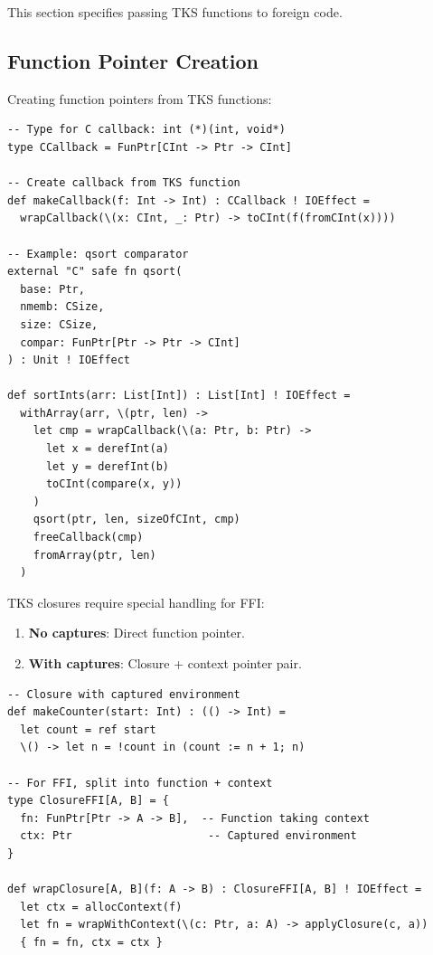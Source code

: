This section specifies passing TKS functions to foreign code.

\subsection{Function Pointer Creation}
\label{subsec:funptr-creation}

\begin{definition}
\label{def:callback-syntax}
Creating function pointers from TKS functions:
\begin{verbatim}
-- Type for C callback: int (*)(int, void*)
type CCallback = FunPtr[CInt -> Ptr -> CInt]

-- Create callback from TKS function
def makeCallback(f: Int -> Int) : CCallback ! IOEffect =
  wrapCallback(\(x: CInt, _: Ptr) -> toCInt(f(fromCInt(x))))

-- Example: qsort comparator
external "C" safe fn qsort(
  base: Ptr,
  nmemb: CSize,
  size: CSize,
  compar: FunPtr[Ptr -> Ptr -> CInt]
) : Unit ! IOEffect

def sortInts(arr: List[Int]) : List[Int] ! IOEffect =
  withArray(arr, \(ptr, len) ->
    let cmp = wrapCallback(\(a: Ptr, b: Ptr) ->
      let x = derefInt(a)
      let y = derefInt(b)
      toCInt(compare(x, y))
    )
    qsort(ptr, len, sizeOfCInt, cmp)
    freeCallback(cmp)
    fromArray(ptr, len)
  )
\end{verbatim}
\end{definition}

\begin{definition}
\label{def:closure-conversion}
TKS closures require special handling for FFI:
\begin{enumerate}
  \item \textbf{No captures}: Direct function pointer.
  \item \textbf{With captures}: Closure + context pointer pair.
\end{enumerate}
\begin{verbatim}
-- Closure with captured environment
def makeCounter(start: Int) : (() -> Int) =
  let count = ref start
  \() -> let n = !count in (count := n + 1; n)

-- For FFI, split into function + context
type ClosureFFI[A, B] = {
  fn: FunPtr[Ptr -> A -> B],  -- Function taking context
  ctx: Ptr                     -- Captured environment
}

def wrapClosure[A, B](f: A -> B) : ClosureFFI[A, B] ! IOEffect =
  let ctx = allocContext(f)
  let fn = wrapWithContext(\(c: Ptr, a: A) -> applyClosure(c, a))
  { fn = fn, ctx = ctx }
\end{verbatim}
\end{definition}

